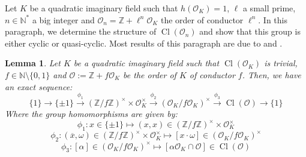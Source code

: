 \documentclass[a4paper,10pt]{report}
\theoremstyle{definition}
\theoremstyle{plain}
\newtheorem{lemma}[definition]{Lemma}
\theoremstyle{definition}
\newcommand{\N}{\mathbb{N}}
\newcommand{\Z}{\mathbb{Z}}
\newcommand{\mO}{\mathcal{O}}
\renewcommand{\(}{\left(}
\renewcommand{\)}{\right)}
\DeclareMathOperator{\Cl}{Cl}
\begin{document}
Let $K$ be a quadratic imaginary field such that $h(\mO_K)=1$, $\ell$ a small prime, $n\in\N^*$ a big integer and $\mO_n=\Z+\ell^n\mO_K$ the order of conductor $\ell^n$.  In this paragraph, we determine the structure of $\Cl(\mO_n)$ and show that this group is either cyclic or quasi-cyclic. Most results of this paragraph are due to \cite[chapter 7]{Cox} and \cite[chapter 4]{Cohen2}.

\begin{lemma}
Let $K$ be a quadratic imaginary field such that $\Cl(\mO_K)$ is trivial, $f\in\N\setminus\{0,1\}$ and $\mO:=\Z+f\mO_K$ be the order of $K$ of conductor $f$. Then, we have an exact sequence:
\[\{1\}\longrightarrow\{\pm 1\}\overset{\phi_1}{\longrightarrow} (\Z/f\Z)^\times\times \mO_K^\times\overset{\phi_2}{\longrightarrow} (\mO_K/f\mO_K)^\times\overset{\phi_3}{\longrightarrow} \Cl(\mO)\longrightarrow\{1\}\]
Where the group homomorphisms are given by:
\[\phi_1:x\in\{\pm 1\}\longmapsto (x,x)\in (\Z/f\Z)^\times\times \mO_K^\times\]
\[\phi_2:(\overline{x},\omega)\in (\Z/f\Z)^\times\times \mO_K^\times\longmapsto [x\cdot \omega]\in(\mO_K/f\mO_K)^\times\]
\[\phi_3:[\alpha]\in(\mO_K/f\mO_K)^\times\longmapsto [\alpha\mO_K\cap\mO]\in \Cl(\mO)\]
\end{lemma}
\end{document}
